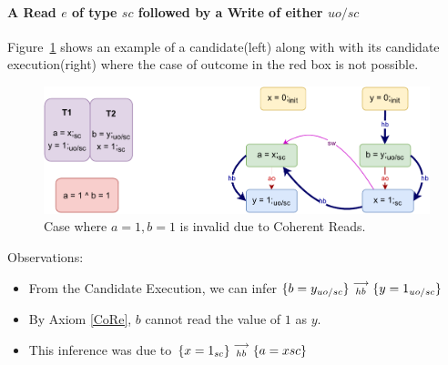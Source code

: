         
    
    \paragraph{A Read $e$ of type $sc$ followed by a Write of either $uo/sc$}
        
        Figure~\ref{reord_counter:example2(a)} shows an example of a candidate(left) along with with its candidate execution(right) where the case of outcome in the red box is not possible. 
        \begin{figure}[H]
            \centering
            \includegraphics[scale=0.7]{4.InstructionReordering/4.ValidReorderingCandidate/Example3(Rsc-Wuo,sc).pdf}
            \caption{Case where $a = 1, b = 1$ is invalid due to Coherent Reads.}
            \label{reord_counter:example2(a)}
        \end{figure}

        Observations:
        \begin{itemize}
            \item From the Candidate Execution, we can infer $\{b=y_{uo/sc}\}\stackrel{\longrightarrow}{_{hb}}\{y=1_{uo/sc}\}$
            \item By Axiom \ref{CoRe}, $b$ cannot read the value of $1$ as $y$. 
            \item This inference was due to $\{x=1_{sc}\}\stackrel{\longrightarrow}{_{hb}}\{a=x{sc}\}$
        \end{itemize}

